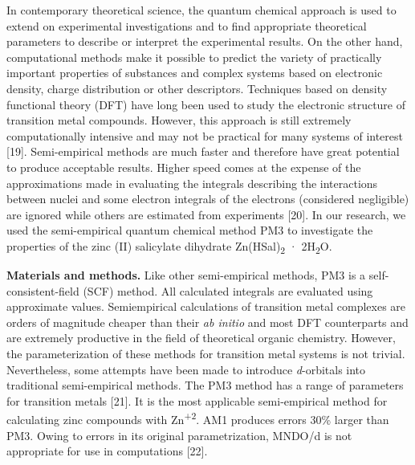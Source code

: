 In contemporary theoretical science, the quantum chemical approach is
used to extend on experimental investigations and to find appropriate
theoretical parameters to describe or interpret the experimental
results. On the other hand, computational methods make it possible to
predict the variety of practically important properties of substances
and complex systems based on electronic density, charge distribution or
other descriptors. Techniques based on density functional theory (DFT)
have long been used to study the electronic structure of transition
metal compounds. However, this approach is still extremely
computationally intensive and may not be practical for many systems of
interest {[}19{]}. Semi-empirical methods are much faster and therefore
have great potential to produce acceptable results. Higher speed comes
at the expense of the approximations made in evaluating the integrals
describing the interactions between nuclei and some electron integrals
of the electrons (considered negligible) are ignored while others are
estimated from experiments {[}20{]}. In our research, we used the
semi-empirical quantum chemical method PM3 to investigate the properties
of the zinc (II) salicylate dihydrate Zn(HSal)\textsubscript{2} ·
2H\textsubscript{2}O.

{\bfseries Materials and methods.} Like other semi-empirical methods, PM3
is a self-consistent-field (SCF) method. All calculated integrals are
evaluated using approximate values. Semiempirical calculations of
transition metal complexes are orders of magnitude cheaper than their
\emph{ab initio} and most DFT counterparts and are extremely productive
in the field of theoretical organic chemistry. However, the
parameterization of these methods for transition metal systems is not
trivial. Nevertheless, some attempts have been made to introduce
\emph{d}-orbitals into traditional semi-empirical methods. The PM3
method has a range of parameters for transition metals {[}21{]}. It is
the most applicable semi-empirical method for calculating zinc compounds
with Zn\textsuperscript{+2}. AM1 produces errors 30\% larger than PM3.
Owing to errors in its original parametrization, MNDO/d is not
appropriate for use in computations {[}22{]}.

